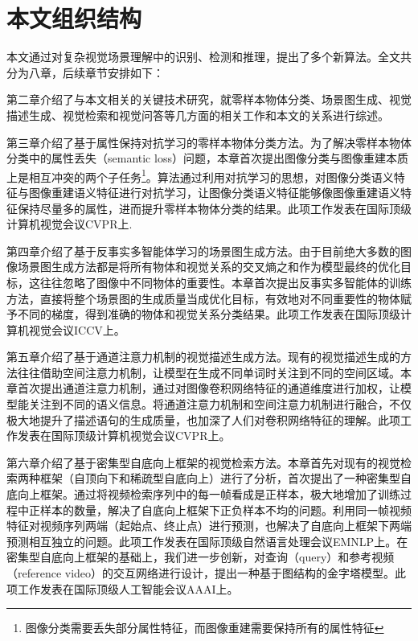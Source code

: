 \section{本文组织结构}
本文通过对复杂视觉场景理解中的识别、检测和推理，提出了多个新算法。全文共分为八章，后续章节安排如下：
\begin{asparaitem}
\item 第二章介绍了与本文相关的关键技术研究，就零样本物体分类、场景图生成、视觉描述生成、视觉检索和视觉问答等几方面的相关工作和本文的关系进行综述。


\item 第三章介绍了基于属性保持对抗学习的零样本物体分类方法。为了解决零样本物体分类中的属性丢失（semantic loss）问题，本章首次提出图像分类与图像重建本质上是相互冲突的两个子任务\footnote{图像分类需要丢失部分属性特征，而图像重建需要保持所有的属性特征}。算法通过利用对抗学习的思想，对图像分类语义特征与图像重建语义特征进行对抗学习，让图像分类语义特征能够像图像重建语义特征保持尽量多的属性，进而提升零样本物体分类的结果。此项工作发表在国际顶级计算机视觉会议CVPR上.

\item 第四章介绍了基于反事实多智能体学习的场景图生成方法。由于目前绝大多数的图像场景图生成方法都是将所有物体和视觉关系的交叉熵之和作为模型最终的优化目标，这往往忽略了图像中不同物体的重要性。本章首次提出反事实多智能体的训练方法，直接将整个场景图的生成质量当成优化目标，有效地对不同重要性的物体赋予不同的梯度，得到准确的物体和视觉关系分类结果。此项工作发表在国际顶级计算机视觉会议ICCV上。


\item 第五章介绍了基于通道注意力机制的视觉描述生成方法。现有的视觉描述生成的方法往往借助空间注意力机制，让模型在生成不同单词时关注到不同的空间区域。本章首次提出通道注意力机制，通过对图像卷积网络特征的通道维度进行加权，让模型能关注到不同的语义信息。将通道注意力机制和空间注意力机制进行融合，不仅极大地提升了描述语句的生成质量，也加深了人们对卷积网络特征的理解。此项工作发表在国际顶级计算机视觉会议CVPR上。


\item 第六章介绍了基于密集型自底向上框架的视觉检索方法。本章首先对现有的视觉检索两种框架（自顶向下和稀疏型自底向上）进行了分析，首次提出了一种密集型自底向上框架。通过将视频检索序列中的每一帧看成是正样本，极大地增加了训练过程中正样本的数量，解决了自底向上框架下正负样本不均的问题。利用同一帧视频特征对视频序列两端（起始点、终止点）进行预测，也解决了自底向上框架下两端预测相互独立的问题。此项工作发表在国际顶级自然语言处理会议EMNLP上。在密集型自底向上框架的基础上，我们进一步创新，对查询（query）和参考视频（reference video）的交互网络进行设计，提出一种基于图结构的金字塔模型。此项工作发表在国际顶级人工智能会议AAAI上。



\end{asparaitem}
